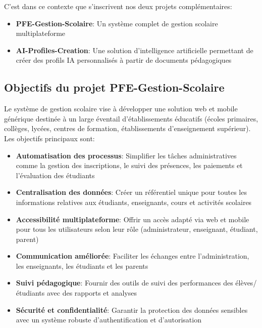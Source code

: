 C'est dans ce contexte que s'inscrivent nos deux projets complémentaires:

\begin{itemize}
  \item \textbf{PFE-Gestion-Scolaire}: Un système complet de gestion scolaire multiplateforme
  \item \textbf{AI-Profiles-Creation}: Une solution d'intelligence artificielle permettant de créer des profils IA personnalisés à partir de documents pédagogiques
\end{itemize}

\subsection{Objectifs du projet PFE-Gestion-Scolaire}

Le système de gestion scolaire vise à développer une solution web et mobile générique destinée à un large éventail d'établissements éducatifs (écoles primaires, collèges, lycées, centres de formation, établissements d'enseignement supérieur). Les objectifs principaux sont:

\begin{itemize}
  \item \textbf{Automatisation des processus}: Simplifier les tâches administratives comme la gestion des inscriptions, le suivi des présences, les paiements et l'évaluation des étudiants
  
  \item \textbf{Centralisation des données}: Créer un référentiel unique pour toutes les informations relatives aux étudiants, enseignants, cours et activités scolaires
  
  \item \textbf{Accessibilité multiplateforme}: Offrir un accès adapté via web et mobile pour tous les utilisateurs selon leur rôle (administrateur, enseignant, étudiant, parent)
  
  \item \textbf{Communication améliorée}: Faciliter les échanges entre l'administration, les enseignants, les étudiants et les parents
  
  \item \textbf{Suivi pédagogique}: Fournir des outils de suivi des performances des élèves/étudiants avec des rapports et analyses
  
  \item \textbf{Sécurité et confidentialité}: Garantir la protection des données sensibles avec un système robuste d'authentification et d'autorisation
\end{itemize}

